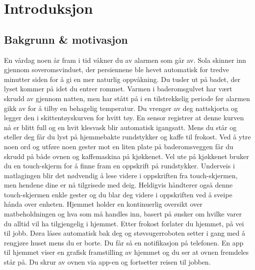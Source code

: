 \section[Introduksjon]{Introduksjon}
\subsection*{Bakgrunn \& motivasjon}
En vårdag noen år fram i tid våkner du av alarmen som går av. Sola skinner inn gjennom soveromsvinduet, der persiennene ble hevet automatisk for tredve minutter siden for å gi en mer naturlig oppvåkning. Du tusler ut på badet, der lyset kommer på idet du entrer rommet. Varmen i baderomsgulvet har vært skrudd av gjennom natten, men har stått på i en tilstrekkelig periode før alarmen gikk av for å tilby en behagelig temperatur. Du vrenger av deg nattskjorta og legger den i skittentøyskurven for hvitt tøy. En sensor registrer at denne kurven nå er blitt full og en hvit klesvask blir automatisk igangsatt. Mens du står og steller deg får du lyst på hjemmebakte rundstykker og kaffe til frokost. Ved å ytre noen ord og utføre noen gester mot en liten plate på baderomsveggen får du skrudd på både ovnen og kaffemaskina på kjøkkenet. Vel ute på kjøkkenet bruker du en touch-skjerm for å finne fram en oppskrift på rundstykker. Underveis i matlagingen blir det nødvendig å lese videre i oppskriften fra touch-skjermen, men hendene dine er nå tilgrisede med deig. Heldigvis håndterer også denne touch-skjermen enkle gester og du blar deg videre i oppskriften ved å sveipe hånda over enheten. Hjemmet holder en kontinuerlig oversikt over matbeholdningen og hva som må handles inn, basert på ønsker om hvilke varer du alltid vil ha tilgjengelig i hjemmet. Etter frokost forlater du hjemmet, på vei til jobb. Døra låses automatisk bak deg og støvsugerroboten setter i gang med å rengjøre huset mens du er borte. Du får så en notifikasjon på telefonen. En app til hjemmet viser en grafisk framstilling av hjemmet og du ser at ovnen fremdeles står på. Du skrur av ovnen via app-en og fortsetter reisen til jobben.

